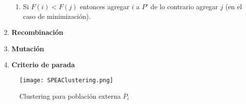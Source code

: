 \documentclass[10pt,onecolumn,twoside,letterpaper]{article}
\newcommand{\myreferences}{../../../doc/review/review/library}
\begin{document}
\begin{multicols}{2}
\begin{enumerate}
\begin{enumerate}
  \item Si $F(i)<F(j)$ entonces agregar $i$ a $P'$ de lo contrario agregar $j$ (en el caso de minimizaci\'on).
  \end{enumerate}
\item \textbf{Recombinaci\'on}
\item \textbf{Mutaci\'on}
\item \textbf{Criterio de parada}
\end{enumerate}
\begin{figure}[H]
  \centering
  \texttt{[image: SPEAClustering.png]}
  \caption{Clustering para poblaci\'on externa $\overline{P}_i$}
  \label{fig:clustering}
\end{figure}
\end{multicols}

\end{document}
